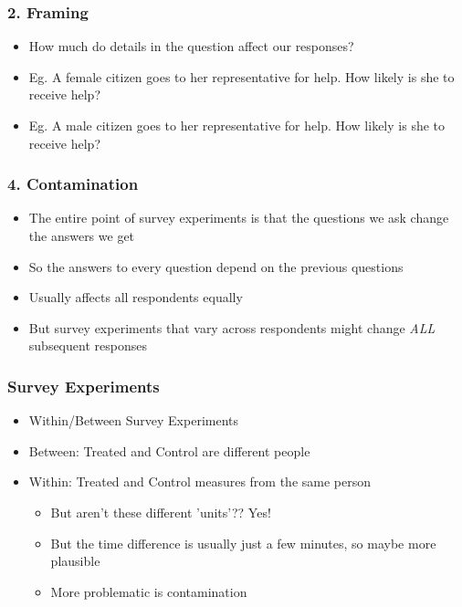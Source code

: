 \documentclass[xcolor=x11names,compress]{beamer}\usepackage[]{graphicx}\usepackage[]{color}
\renewcommand{\(}{\begin{columns}}
\renewcommand{\)}{\end{columns}}
\newcommand{\<}[1]{\begin{column}{#1}}
\renewcommand{\>}{\end{column}}
\begin{document}
\begin{frame}
\frametitle{2. Framing}
\begin{itemize}
\item How much do details in the question affect our responses?
\pause
\item Eg. A female citizen goes to her representative for help. How likely is she to receive help?
\pause
\item Eg. A male citizen goes to her representative for help. How likely is she to receive help?
\end{itemize}
\end{frame}


\begin{frame}
\frametitle{4. Contamination}
\begin{itemize}
\pause 
\item The entire point of survey experiments is that the questions we ask change the answers we get
\pause
\item So the answers to every question depend on the previous questions
\pause 
\item Usually affects all respondents equally
\pause 
\item But survey experiments that vary across respondents might change \textit{ALL} subsequent responses
\end{itemize}
\end{frame}

\begin{frame}
\frametitle{Survey Experiments}
\begin{itemize}
\item Within/Between Survey Experiments
\pause
\item Between: Treated and Control are different people
\pause
\item Within: Treated and Control measures from the same person
\begin{itemize}
\item But aren't these different 'units'?? \pause Yes!
\pause
\item But the time difference is usually just a few minutes, so maybe more plausible
\pause
\item More problematic is contamination
\end{itemize}
\end{itemize}
\end{frame}
\end{document}
